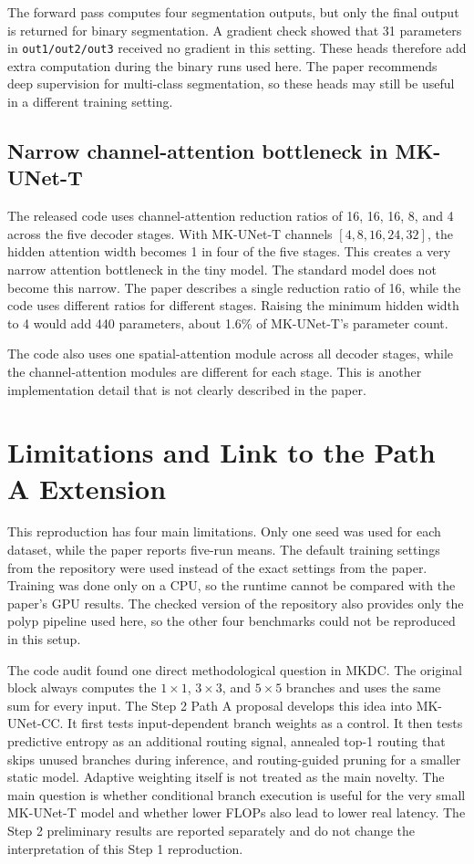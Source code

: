 \documentclass[10pt,a4paper]{article}
\begin{document}
The forward pass computes four segmentation outputs, but only the final output is returned for binary segmentation. A gradient check showed that 31 parameters in \texttt{out1/out2/out3} received no gradient in this setting. These heads therefore add extra computation during the binary runs used here. The paper recommends deep supervision for multi-class segmentation, so these heads may still be useful in a different training setting.

\subsection{Narrow channel-attention bottleneck in MK-UNet-T}

The released code uses channel-attention reduction ratios of 16, 16, 16, 8, and 4 across the five decoder stages. With MK-UNet-T channels $[4,8,16,24,32]$, the hidden attention width becomes 1 in four of the five stages. This creates a very narrow attention bottleneck in the tiny model. The standard model does not become this narrow. The paper describes a single reduction ratio of 16, while the code uses different ratios for different stages. Raising the minimum hidden width to 4 would add 440 parameters, about 1.6\% of MK-UNet-T's parameter count.

The code also uses one spatial-attention module across all decoder stages, while the channel-attention modules are different for each stage. This is another implementation detail that is not clearly described in the paper.

\section{Limitations and Link to the Path A Extension}

This reproduction has four main limitations. Only one seed was used for each dataset, while the paper reports five-run means. The default training settings from the repository were used instead of the exact settings from the paper. Training was done only on a CPU, so the runtime cannot be compared with the paper's GPU results. The checked version of the repository also provides only the polyp pipeline used here, so the other four benchmarks could not be reproduced in this setup.

The code audit found one direct methodological question in MKDC. The original block always computes the $1\times1$, $3\times3$, and $5\times5$ branches and uses the same sum for every input. The Step 2 Path A proposal develops this idea into MK-UNet-CC. It first tests input-dependent branch weights as a control. It then tests predictive entropy as an additional routing signal, annealed top-1 routing that skips unused branches during inference, and routing-guided pruning for a smaller static model. Adaptive weighting itself is not treated as the main novelty. The main question is whether conditional branch execution is useful for the very small MK-UNet-T model and whether lower FLOPs also lead to lower real latency. The Step 2 preliminary results are reported separately and do not change the interpretation of this Step 1 reproduction.
\end{document}
